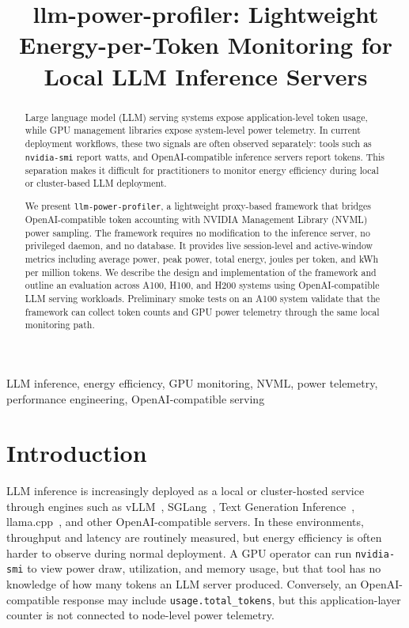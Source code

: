 \documentclass[conference]{IEEEtran}
\begin{document}
\title{llm-power-profiler: Lightweight Energy-per-Token Monitoring for Local LLM Inference Servers}

\author{
}

\maketitle

\begin{abstract}
Large language model (LLM) serving systems expose application-level token usage, while GPU management libraries expose system-level power telemetry. In current deployment workflows, these two signals are often observed separately: tools such as \texttt{nvidia-smi} report watts, and OpenAI-compatible inference servers report tokens. This separation makes it difficult for practitioners to monitor energy efficiency during local or cluster-based LLM deployment.

We present \texttt{llm-power-profiler}, a lightweight proxy-based framework that bridges OpenAI-compatible token accounting with NVIDIA Management Library (NVML) power sampling. The framework requires no modification to the inference server, no privileged daemon, and no database. It provides live session-level and active-window metrics including average power, peak power, total energy, joules per token, and kWh per million tokens. We describe the design and implementation of the framework and outline an evaluation across A100, H100, and H200 systems using OpenAI-compatible LLM serving workloads. Preliminary smoke tests on an A100 system validate that the framework can collect token counts and GPU power telemetry through the same local monitoring path.
\end{abstract}

\begin{IEEEkeywords}
LLM inference, energy efficiency, GPU monitoring, NVML, power telemetry, performance engineering, OpenAI-compatible serving
\end{IEEEkeywords}

\section{Introduction}

LLM inference is increasingly deployed as a local or cluster-hosted service through engines such as vLLM~\cite{kwon2023vllm}, SGLang~\cite{sglang}, Text Generation Inference~\cite{tgi}, llama.cpp~\cite{llama_cpp}, and other OpenAI-compatible servers. In these environments, throughput and latency are routinely measured, but energy efficiency is often harder to observe during normal deployment. A GPU operator can run \texttt{nvidia-smi} to view power draw, utilization, and memory usage, but that tool has no knowledge of how many tokens an LLM server produced. Conversely, an OpenAI-compatible response may include \texttt{usage.total\_tokens}, but this application-layer counter is not connected to node-level power telemetry.
\end{document}
